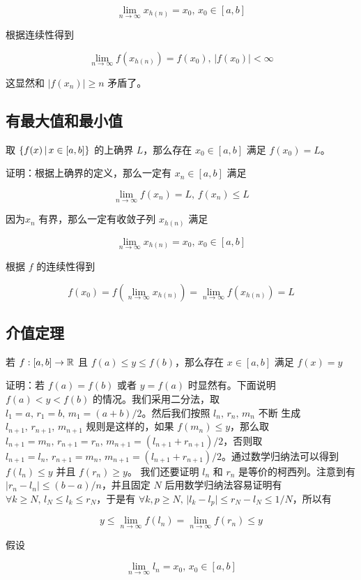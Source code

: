 \[
\lim_{n \to \infty}x_{h(n)} = x_0,\, x_0 \in [a,b]
\]

根据连续性得到 


\[
\lim_{n \to \infty}f(x_{h(n)}) = f(x_0),\, \lvert f(x_0) \rvert < \infty
\]

这显然和 $\lvert f(x_n) \rvert \ge n$ 矛盾了。


\subsection{有最大值和最小值}

取 $\{f(x) \,\vert\, x \in [a,b]\}$ 的上确界 $L$，那么存在 $x_0 \in [a,b]$ 满足 $f(x_0) = L$。

证明：根据上确界的定义，那么一定有 $x_n \in [a,b]$ 满足 

\[
    \lim_{n \to \infty}f(x_n) = L,\, f(x_n) \le L
\]

因为$x_n$ 有界，那么一定有收敛子列 $x_{h(n)}$ 满足

\[
    \lim_{n \to \infty}x_{h(n)} = x_0,\, x_0 \in [a,b]
\]

根据 $f$ 的连续性得到

\[
f(x_0) = f(\lim_{n \to \infty}x_{h(n)}) = \lim_{n \to \infty}f(x_{h(n)}) = L
\]

\subsection{介值定理}

若 $f: [a,b] \to \mathbb{R}$ 且 $f(a) \le y \le f(b)$，那么存在 $x \in [a,b]$ 满足 $f(x) = y$

证明：若 $f(a) = f(b)$ 或者 $y = f(a)$ 时显然有。下面说明 $f(a) < y < f(b)$ 的情况。我们采用二分法，取 $l_1 = a,\, r_1 = b,\, m_1 = (a+b)/2$。然后我们按照 $l_n, \, r_n,\, m_n$ 不断
生成 $l_{n+1},\, r_{n+1},\, m_{n+1}$ 规则是这样的，如果 $f(m_n) \le y$，那么取 $l_{n+1} = m_n,\, r_{n+1} = r_n,\, m_{n+1} = (l_{n+1} + r_{n+1}) /2$，否则取
$l_{n+1} = l_n,\, r_{n+1} = m_n,\, m_{n+1} = (l_{n+1} + r_{n+1}) /2$。通过数学归纳法可以得到 $f(l_n) \le y$ 并且 $f(r_n) \ge y$。
我们还要证明 $l_n$ 和 $r_n$ 是等价的柯西列。注意到有 $\lvert r_n - l_n \rvert \le (b-a)/n$，并且固定 $N$ 后用数学归纳法容易证明有 $\forall k  \ge N,\, l_N \le l_k \le r_N$，于是有 $\forall k, p \ge N,\, \lvert l_k - l_p \rvert \le r_N - l_N \le 1/N $，所以有

\[
    y \le \lim_{n \to \infty} f(l_n) = \lim_{n \to \infty} f(r_n) \le y
\]

假设

\[
\lim_{n \to \infty} l_n = x_0,\, x_0 \in [a,b]
\]


